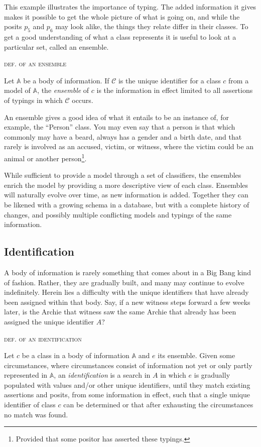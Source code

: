 \documentclass[sfsidenotes,nobib,twoside,symmetric]{tufte-handout}
\newcounter{majorcount}
\newcommand{\deffy}[3]{
	\vspace{2ex}
	\refstepcounter{majorcount} 
	\noindent\textsc{#1}%
	\\\begin{small}
	\noindent #2%
	\label{Def:#3}
	\end{small}
	\vspace{2ex}
}
\begin{document}
This example illustrates the importance of typing. The added information it gives makes it possible to get the whole picture of what is going on, and while the posits $p_5$ and $p_6$ may look alike, the things they relate differ in their classes. To get a good understanding of what a class represents it is useful to look at a particular set, called an ensemble.

\deffy{def. of an ensemble}{%
Let $\mathbb{A}$ be a body of information. If $\mathcal{C}$ is the unique identifier for a class $c$ from a model of $\mathbb{A}$, the \emph{ensemble} of $c$ is the information in effect limited to all assertions of typings in which $\mathcal{C}$ occurs. 
}{ensemble}

An ensemble gives a good idea of what it entails to be an instance of, for example, the \enquote{Person} class. You may even say that a person is that which commonly may have a beard, always has a gender and a birth date, and that rarely is involved as an accused, victim, or witness, where the victim could be an animal or another person\footnote{Provided that some positor has asserted these typings.}.

While sufficient to provide a model through a set of classifiers, the ensembles enrich the model by providing a more descriptive view of each class. Ensembles will naturally evolve over time, as new information is added. Together they can be likened with a growing schema in a database, but with a complete history of changes, and possibly multiple conflicting models and typings of the same information.

\subsection{Identification}
%
A body of information is rarely something that comes about in a Big Bang kind of fashion. Rather, they are gradually built, and many may continue to evolve indefinitely. Herein lies a difficulty with the unique identifiers that have already been assigned within that body. Say, if a new witness steps forward a few weeks later, is the Archie that witness saw the same Archie that already has been assigned the unique identifier $A$? 

\deffy{def. of an identification}{%
Let $c$ be a class in a body of information $\mathbb{A}$ and $e$ its ensemble. Given some circumstances, where circumstances consist of information not yet or only partly represented in $\mathbb{A}$, an \emph{identification} is a search in $A$ in which $e$ is gradually populated with values and/or other unique identifiers, until they match existing assertions and posits, from some information in effect, such that a single unique identifier of class $c$ can be determined or that after exhausting the circumstances no match was found.
}{identification}
\end{document}

